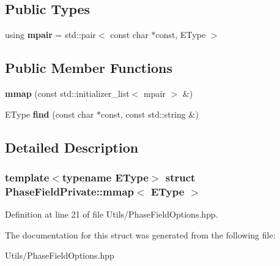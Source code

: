 \subsection*{Public Types}
\begin{DoxyCompactItemize}
\item 
\mbox{\label{structPhaseFieldPrivate_1_1mmap_a7b38f4b4625451828bc4f491313518de}} 
using {\bfseries mpair} = std\+::pair$<$ const char $\ast$const, E\+Type $>$
\end{DoxyCompactItemize}
\subsection*{Public Member Functions}
\begin{DoxyCompactItemize}
\item 
\mbox{\label{structPhaseFieldPrivate_1_1mmap_aa82b94ef4ad96ca08605b274788428a0}} 
{\bfseries mmap} (const std\+::initializer\+\_\+list$<$ mpair $>$ \&)
\item 
\mbox{\label{structPhaseFieldPrivate_1_1mmap_abce88715c469eaf3e4b2856819fbc297}} 
E\+Type {\bfseries find} (const char $\ast$const, const std\+::string \&)
\end{DoxyCompactItemize}


\subsection{Detailed Description}
\subsubsection*{template$<$typename E\+Type$>$\newline
struct Phase\+Field\+Private\+::mmap$<$ E\+Type $>$}



Definition at line 21 of file Utils/\+Phase\+Field\+Options.\+hpp.



The documentation for this struct was generated from the following file\+:\begin{DoxyCompactItemize}
\item 
Utils/\+Phase\+Field\+Options.\+hpp\end{DoxyCompactItemize}
